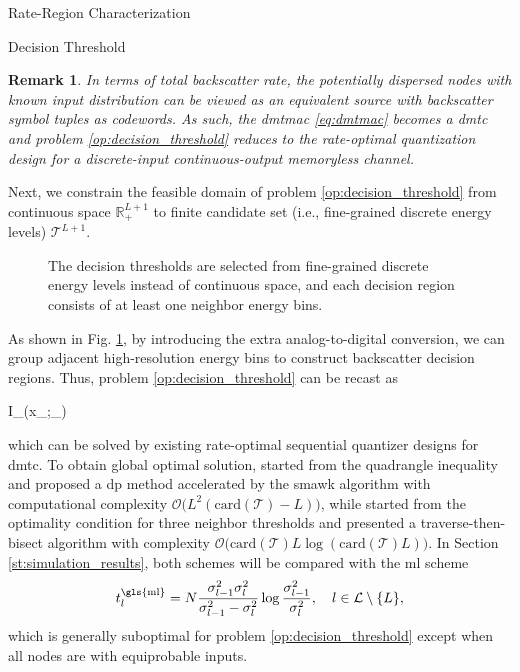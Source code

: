 \documentclass[journal]{IEEEtran}
\newtheorem{remark}{Remark}
\begin{document}
\begin{section}{Rate-Region Characterization}
\begin{subsection}{Decision Threshold}
		\begin{remark}
			In terms of total backscatter rate, the potentially dispersed nodes with known input distribution can be viewed as an equivalent source with backscatter symbol tuples as codewords.
			As such, the \gls{dmtmac} \eqref{eq:dmtmac} becomes a \gls{dmtc} and problem \eqref{op:decision_threshold} reduces to the rate-optimal quantization design for a discrete-input continuous-output memoryless channel.
			\label{re:augmented_source}
		\end{remark}

		Next, we constrain the feasible domain of problem \eqref{op:decision_threshold} from continuous space $\mathbb{R}_+^{L+1}$ to finite candidate set (i.e., fine-grained discrete energy levels) $\mathcal{T}^{L+1}$.
		\begin{figure}[!t]
			\centering
			\resizebox{0.9\columnwidth}{!}{
				
			}
			\caption{The decision thresholds are selected from fine-grained discrete energy levels instead of continuous space, and each decision region consists of at least one neighbor energy bins.}
			\label{fg:discrete_outputs}
		\end{figure}
		As shown in Fig. \ref{fg:discrete_outputs}, by introducing the extra analog-to-digital conversion, we can group adjacent high-resolution energy bins to construct backscatter decision regions.
		Thus, problem \eqref{op:decision_threshold} can be recast as
		\begin{maxi!}
			{}{I_{}(x_{};_{})}{\label{op:decision_threshold_discrete}}{\label{ob:decision_threshold_discrete}}
			\addConstraint{\eqref{co:sequential_threshold},}
		\end{maxi!}
		which can be solved by existing rate-optimal sequential quantizer designs for \gls{dmtc}.
		To obtain global optimal solution, \cite{He2021} started from the quadrangle inequality and proposed a \gls{dp} method accelerated by the \gls{smawk} algorithm with computational complexity $\mathcal{O}\bigl(L^2(\mathrm{card}(\mathcal{T})-L)\bigr)$, while \cite{Nguyen2020a} started from the optimality condition for three neighbor thresholds and presented a traverse-then-bisect algorithm with complexity $\mathcal{O}\bigl(\mathrm{card}(\mathcal{T})L\log(\mathrm{card}(\mathcal{T})L)\bigr)$.
		In Section \ref{st:simulation_results}, both schemes will be compared with the \gls{ml} scheme \cite{Qian2019}
		\begin{equation}
			t_{l}^{\text{\gls{ml}}} = N \frac{\sigma_{l-1}^2 \sigma_{l}^2}{\sigma_{l-1}^2 - \sigma_{l}^2} \log \frac{\sigma_{l-1}^2}{\sigma_{l}^2}, \quad l \in \mathcal{L} \setminus \{L\},
			\label{eq:detection_threshold_ml}
		\end{equation}
		which is generally suboptimal for problem \eqref{op:decision_threshold} except when all nodes are with equiprobable inputs.
	\end{subsection}
\end{section}
\end{document}
